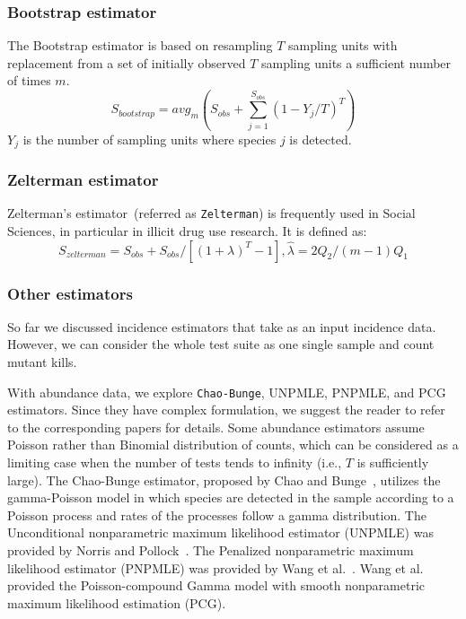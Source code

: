 \documentclass[sigconf]{acmart}
\newcommand{\Zelterman}{Zelterman\xspace}
\newcommand{\ChaoBunge}{Chao-Bunge\xspace}
\newcommand{\Unpmle}{UNPMLE\xspace}
\newcommand{\Bootstrap}{Bootstrap\xspace}
\newcommand{\Pnpmle}{PNPMLE\xspace}
\newcommand{\PCG}{PCG\xspace}
\def\<#1>{\texttt{#1}}
\begin{document}
\subsubsection{Bootstrap estimator~\cite{smith1984nonparametric}}
The \Bootstrap estimator
is based on resampling $T$ sampling units with replacement from a set of
initially observed $T$ sampling units a sufficient number of times $m$.
\begin{displaymath}
S_{bootstrap}  = {avg}_{m}( S_{obs} + \sum^{S_{obs}}_{j=1} (1 - Y_j/T)^T)
\end{displaymath}
$Y_{j}$ is the number of sampling units %
where species $j$ is detected.

\subsubsection{\Zelterman estimator~\cite{bohning2010some}}
Zelterman's estimator~(referred as \<Zelterman>) is frequently used in Social Sciences, in particular in illicit drug use research.
It is defined as:
\begin{displaymath}
    S_{zelterman} = S_{obs} + S_{obs}/[(1+\lambda)^T - 1], \hat{\lambda} = 2Q_2/(m-1)Q_1
\end{displaymath}

\subsubsection{Other estimators}
So far we discussed incidence estimators that take as an input incidence data.
However, we can consider the whole test suite as one single sample and count mutant kills.



With abundance data, we explore \<\ChaoBunge>, \Unpmle, \Pnpmle, and \PCG estimators.
Since they have complex formulation, we suggest the reader to refer to the corresponding papers for details.
Some abundance estimators assume Poisson rather than Binomial distribution of counts, which can be considered as a limiting case when the number of tests tends to infinity
(i.e., $T$ is sufficiently large).
The \ChaoBunge estimator, proposed by Chao and Bunge~\cite{chao2002estimating},
utilizes the gamma-Poisson model in which species are detected in the sample
according to a Poisson process and rates of the processes follow a gamma distribution.
The Unconditional nonparametric maximum likelihood estimator (\Unpmle)
was provided by Norris and Pollock~\cite{norris1998non}.
The Penalized nonparametric maximum likelihood estimator (\Pnpmle)
was provided by Wang et al.~\cite{wang2005penalized}.
Wang et al.~\cite{wang2010estimating} provided the Poisson-compound Gamma model with smooth nonparametric maximum likelihood estimation (\PCG).
\end{document}

